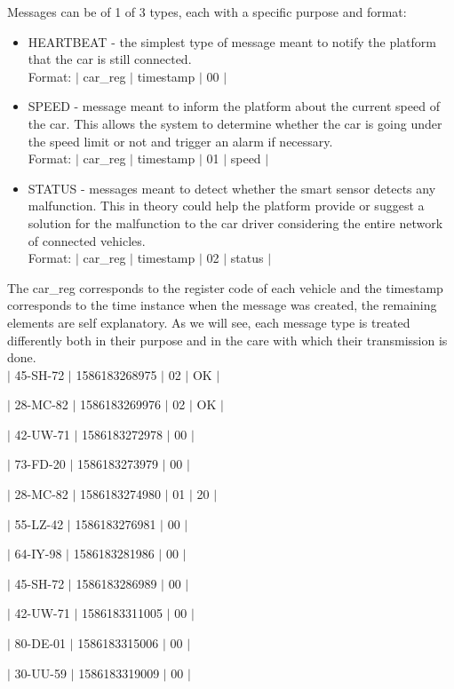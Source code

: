 \documentclass[12pt]{article}
\begin{document}
Messages can be of 1 of 3 types, each with a specific purpose and format:

\vspace{-10pt}
\begin{itemize}[noitemsep]
  \item HEARTBEAT - the simplest type of message meant to notify the platform that the car is still connected. \\ Format: $|$ car\_reg $|$ timestamp $|$ 00 $|$
  \item SPEED - message meant to inform the platform about the current speed of the car. This allows the system to determine whether the car is going under the speed limit or not and trigger an alarm if necessary. \\ Format: $|$ car\_reg $|$ timestamp $|$ 01 $|$ speed $|$
  \item STATUS - messages meant to detect whether the smart sensor detects any malfunction. This in theory could help the platform provide or suggest a solution for the malfunction to the car driver considering the entire network of connected vehicles. \\ Format: $|$ car\_reg $|$ timestamp $|$ 02 $|$ status $|$
\end{itemize}
\vspace{-10pt}
The car\_reg corresponds to the register code of each vehicle and the timestamp corresponds to the time instance when the message was created, the remaining 
elements are self explanatory.
As we will see, each message type is treated differently both in their purpose and in the care with which their transmission is done. \\
  
$|$ 45-SH-72 $|$ 1586183268975 $|$ 02 $|$ OK $|$

$|$ 28-MC-82 $|$ 1586183269976 $|$ 02 $|$ OK $|$

$|$ 42-UW-71 $|$ 1586183272978 $|$ 00 $|$

$|$ 73-FD-20 $|$ 1586183273979 $|$ 00 $|$

$|$ 28-MC-82 $|$ 1586183274980 $|$ 01 $|$ 20 $|$

$|$ 55-LZ-42 $|$ 1586183276981 $|$ 00 $|$

$|$ 64-IY-98 $|$ 1586183281986 $|$ 00 $|$

$|$ 45-SH-72 $|$ 1586183286989 $|$ 00 $|$

$|$ 42-UW-71 $|$ 1586183311005 $|$ 00 $|$

$|$ 80-DE-01 $|$ 1586183315006 $|$ 00 $|$

$|$ 30-UU-59 $|$ 1586183319009 $|$ 00 $|$
\end{document}

